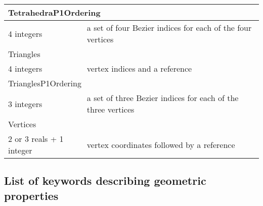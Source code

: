 \documentclass[a4paper,12pt]{article}
\begin{document}
\begin{longtable}{|m{4cm}|m{11cm}|}
\multicolumn{2}{|l|}{TetrahedraP1Ordering} \\
\hline
4 integers & a set of four Bezier indices for each of the four vertices \\
\hline\hline

\multicolumn{2}{|l|}{Triangles} \\
\hline
4 integers & vertex indices and a reference \\
\hline\hline

\multicolumn{2}{|l|}{TrianglesP1Ordering} \\
\hline
3 integers & a set of three Bezier indices for each of the three vertices \\
\hline\hline

\multicolumn{2}{|l|}{Vertices} \\
\hline
2 or 3 reals + 1 integer & vertex coordinates followed by a reference \\
\hline

\end{longtable}


\subsection{List of keywords describing geometric properties}
\end{document}
